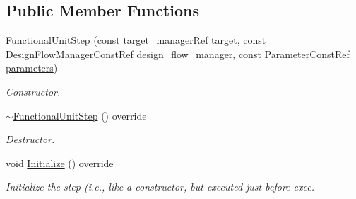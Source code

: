 \subsection*{Public Member Functions}
\begin{DoxyCompactItemize}
\item 
\hyperlink{classFunctionalUnitStep_a110c80e9c9c11fc261aa949f19f66b43}{Functional\+Unit\+Step} (const \hyperlink{target__manager_8hpp_aee0b586a84fb6eb4faefa6e41e1735a9}{target\+\_\+manager\+Ref} \hyperlink{classFunctionalUnitStep_a1f90bc8bd6531c4cdf67966734a66cea}{target}, const Design\+Flow\+Manager\+Const\+Ref \hyperlink{classDesignFlowStep_ab770677ddf087613add30024e16a5554}{design\+\_\+flow\+\_\+manager}, const \hyperlink{Parameter_8hpp_a37841774a6fcb479b597fdf8955eb4ea}{Parameter\+Const\+Ref} \hyperlink{classDesignFlowStep_a802eaafe8013df706370679d1a436949}{parameters})
\begin{DoxyCompactList}\small\item\em Constructor. \end{DoxyCompactList}\item 
\hyperlink{classFunctionalUnitStep_ad4fa61a1bc13ff06f21a052763bbb6db}{$\sim$\+Functional\+Unit\+Step} () override
\begin{DoxyCompactList}\small\item\em Destructor. \end{DoxyCompactList}\item 
void \hyperlink{classFunctionalUnitStep_a7957c47789e5d4a97eb9315872dc8d37}{Initialize} () override
\begin{DoxyCompactList}\small\item\em Initialize the step (i.\+e., like a constructor, but executed just before exec. \end{DoxyCompactList}\end{DoxyCompactItemize}
